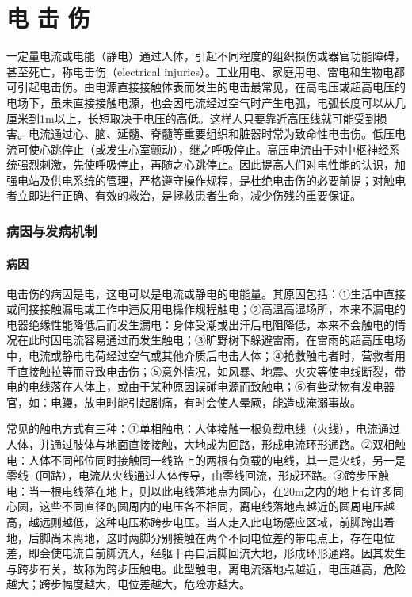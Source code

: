 \chapter{电 击 伤}

一定量电流或电能（静电）通过人体，引起不同程度的组织损伤或器官功能障碍，甚至死亡，称电击伤（electrical
injuries）。工业用电、家庭用电、雷电和生物电都可引起电击伤。由电源直接接触体表而发生的电击最常见，在高电压或超高电压的电场下，虽未直接接触电源，也会因电流经过空气时产生电弧，电弧长度可以从几厘米到1m以上，长短取决于电压的高低。这样人只要靠近高压线就可能受到损害。电流通过心、脑、延髓、脊髓等重要组织和脏器时常为致命性电击伤。低压电流可使心跳停止（或发生心室颤动），继之呼吸停止。高压电流由于对中枢神经系统强烈刺激，先使呼吸停止，再随之心跳停止。因此提高人们对电性能的认识，加强电站及供电系统的管理，严格遵守操作规程，是杜绝电击伤的必要前提；对触电者立即进行正确、有效的救治，是拯救患者生命，减少伤残的重要保证。

\subsection{病因与发病机制}

\subsubsection{病因}

电击伤的病因是电，这电可以是电流或静电的电能量。其原因包括：①生活中直接或间接接触漏电或工作中违反用电操作规程触电；②高温高湿场所，本来不漏电的电器绝缘性能降低后而发生漏电：身体受潮或出汗后电阻降低，本来不会触电的情况在此时因电流容易通过而发生触电；③旷野树下躲避雷雨，在雷雨的超高压电场中，电流或静电电荷经过空气或其他介质后电击人体；④抢救触电者时，营救者用手直接触拉等而导致电击伤；⑤意外情况，如风暴、地震、火灾等使电线断裂，带电的电线落在人体上，或由于某种原因误碰电源而致触电；⑥有些动物有发电器官，如：电鳗，放电时能引起剧痛，有时会使人晕厥，能造成淹溺事故。

常见的触电方式有三种：①单相触电：人体接触一根负载电线（火线），电流通过人体，并通过肢体与地面直接接触，大地成为回路，形成电流环形通路。②双相触电：人体不同部位同时接触同一线路上的两根有负载的电线，其一是火线，另一是零线（回路），电流从火线通过人体传导，由零线回流，形成环路。③跨步压触电：当一根电线落在地上，则以此电线落地点为圆心，在20m之内的地上有许多同心圆，这些不同直径的圆周内的电压各不相同，离电线落地点越近的圆周电压越高，越远则越低，这种电压称跨步电压。当人走入此电场感应区域，前脚跨出着地，后脚尚未离地，这时两脚分别接触在两个不同电位差的带电点上，存在电位差，即会使电流自前脚流入，经躯干再自后脚回流大地，形成环形通路。因其发生与跨步有关，故称为跨步压触电。此型触电，离电流落地点越近，电压越高，危险越大；跨步幅度越大，电位差越大，危险亦越大。

